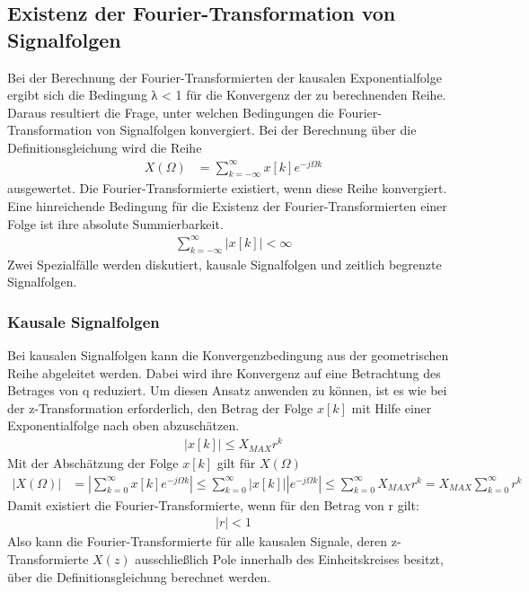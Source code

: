 \subsection{Existenz der Fourier-Transformation von Signalfolgen}\label{sec:7.1.4}

Bei der Berechnung der Fourier-Transformierten der kausalen Exponentialfolge ergibt sich die Bedingung \textbar λ\textbar{} \textless{} 1 für die Konvergenz der zu berechnenden Reihe. Daraus resultiert die Frage, unter welchen Bedingungen die Fourier-Transformation von Signalfolgen konvergiert. Bei der Berechnung über die Definitionsgleichung wird die Reihe
\begin{align}
X(\Omega) &= \sum\limits_{k = - \infty}^{\infty}{x[ k]  e^{- j  \Omega  k}} \label{eq:7.29}
\end{align}
ausgewertet. Die Fourier-Transformierte existiert, wenn diese Reihe konvergiert. Eine hinreichende Bedingung für die Existenz der Fourier-Transformierten einer Folge ist ihre absolute Summierbarkeit.
\begin{align}
\sum\limits_{k = - \infty}^{\infty}{\left| x[ k] \right| < \infty} \label{eq:7.30}
\end{align}
Zwei Spezialfälle werden diskutiert, kausale Signalfolgen und zeitlich begrenzte Signalfolgen.

\subsubsection{Kausale Signalfolgen}\label{sec:kausale-signalfolgen}

Bei kausalen Signalfolgen kann die Konvergenzbedingung aus der geometrischen Reihe abgeleitet werden. Dabei wird ihre Konvergenz auf eine Betrachtung des Betrages von q reduziert. Um diesen Ansatz anwenden zu können, ist es wie bei der z-Transformation erforderlich, den Betrag der Folge \(x[k]\) mit Hilfe einer Exponentialfolge nach oben abzuschätzen.
\begin{align}
\left| x[ k] \right| \leq X_{MAX}  r^{k} \label{eq:7.31}
\end{align}
Mit der Abschätzung der Folge \(x[k]\) gilt für \(X(Ω)\)
\begin{align}
\left| X(\Omega) \right| &= \left| \sum\limits_{k = 0}^{\infty}{x[ k]  e^{- j  \Omega  k}} \right| \leq \sum\limits_{k = 0}^{\infty}{\left| x[ k] \right|  \left| e^{- j  \Omega  k} \right|} \leq \sum\limits_{k = 0}^{\infty}{X_{MAX}  r^{k}} = X_{MAX}  \sum\limits_{k = 0}^{\infty}r^{k} \label{eq:7.32}
\end{align}
Damit existiert die Fourier-Transformierte, wenn für den Betrag von r gilt:
\begin{align}
|r| < 1 \label{eq:7.33}
\end{align}
Also kann die Fourier-Transformierte für alle kausalen Signale, deren z-Transformierte \(X(z)\) ausschließlich Pole innerhalb des Einheitskreises besitzt, über die Definitionsgleichung berechnet werden.

